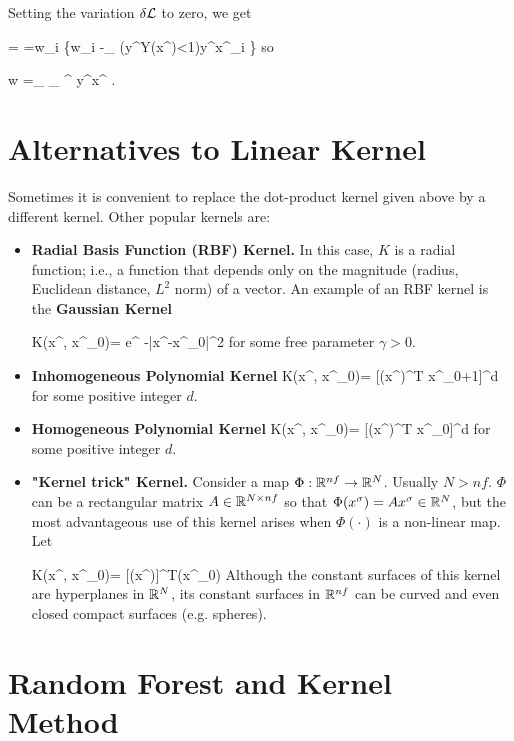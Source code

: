Setting the variation $\delta {\cal L}$
to zero, we get

=\delta \call
=\delta w_i
\left\{w_i -\sum_\s
\indi(y^\s Y(x^\s)<1)y^\s x^\s_i
\right\}
\eeq
so

\beq
 w =\sum_\s
{}_
{\alp^\s}
y^\s x^\s
\;.
\eeq




\section{Alternatives to Linear Kernel}
Sometimes it is convenient to replace
the dot-product kernel given above by 
a different kernel.
Other popular kernels are:

\begin{itemize}
\item 
{\bf Radial Basis Function (RBF) Kernel.}
In this case,
 $K$ is a radial function; i.e., a
function that depends only on 
the magnitude (radius, Euclidean distance,
$L^2$ norm) of a vector. An example of an RBF kernel is the
{\bf Gaussian Kernel}

\beq
K(x^\s, x^{\s_0})=
e^{ -\gamma |x^\s-x^{\s_0}|^2}
\eeq
for some free parameter $\gamma>0$.

\item
{\bf Inhomogeneous Polynomial Kernel}
\beq
K(x^\s, x^{\s_0})=
[(x^\s)^T x^{\s_0}+1]^d
\eeq
for some positive integer $d$.

\item
{\bf Homogeneous Polynomial Kernel}
\beq
K(x^\s, x^{\s_0})=
[(x^\s)^T x^{\s_0}]^d
\eeq
for some positive integer $d$.


\item
{\bf "Kernel trick" Kernel.}
Consider a map $\Phi:{ \mathbb{R}}^{nf}\rightarrow { \mathbb{R}}^N$.
Usually $N>nf$. $\Phi$ can be a
rectangular matrix 
$A\in{ \mathbb{R}}^{N\times nf}$
so that $\Phi(x^\sigma)=Ax^\sigma\in { \mathbb{R}}^N$,
but the most advantageous
use of this kernel arises when $\Phi(\cdot)$
is a non-linear map.
Let



\beq
K(x^\s, x^{\s_0})=
[\Phi(x^\s)]^T\Phi(x^{\s_0})
\eeq
Although the constant surfaces  of 
this kernel are
hyperplanes in ${ \mathbb{R}}^N$,
its constant
surfaces in ${ \mathbb{R}}^{nf}$
can be curved and even closed 
compact surfaces (e.g. spheres).

\end{itemize}

\section{Random Forest and Kernel Method}
